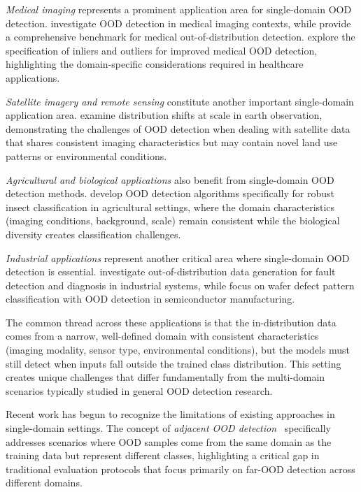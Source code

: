 \documentclass[11pt, oneside]{book}
\theoremstyle{plain}
\theoremstyle{definition}
\theoremstyle{remark}
\begin{document}
\emph{Medical imaging} represents a prominent application area for single-domain OOD detection. \citet{zhang2021out} investigate OOD detection in medical imaging contexts, while \citet{cao2020benchmark} provide a comprehensive benchmark for medical out-of-distribution detection. \citet{narayanaswamy2023exploring} explore the specification of inliers and outliers for improved medical OOD detection, highlighting the domain-specific considerations required in healthcare applications.

\emph{Satellite imagery and remote sensing} constitute another important single-domain application area. \citet{ekim2024distribution} examine distribution shifts at scale in earth observation, demonstrating the challenges of OOD detection when dealing with satellite data that shares consistent imaging characteristics but may contain novel land use patterns or environmental conditions.

\emph{Agricultural and biological applications} also benefit from single-domain OOD detection methods. \citet{saadati2024out} develop OOD detection algorithms specifically for robust insect classification in agricultural settings, where the domain characteristics (imaging conditions, background, scale) remain consistent while the biological diversity creates classification challenges.

\emph{Industrial applications} represent another critical area where single-domain OOD detection is essential. \citet{kafunah2023out} investigate out-of-distribution data generation for fault detection and diagnosis in industrial systems, while \citet{kim2021wafer} focus on wafer defect pattern classification with OOD detection in semiconductor manufacturing.

The common thread across these applications is that the in-distribution data comes from a narrow, well-defined domain with consistent characteristics (imaging modality, sensor type, environmental conditions), but the models must still detect when inputs fall outside the trained class distribution. This setting creates unique challenges that differ fundamentally from the multi-domain scenarios typically studied in general OOD detection research.

Recent work has begun to recognize the limitations of existing approaches in single-domain settings. The concept of \emph{adjacent OOD detection}~\citep{yangcan} specifically addresses scenarios where OOD samples come from the same domain as the training data but represent different classes, highlighting a critical gap in traditional evaluation protocols that focus primarily on far-OOD detection across different domains.
\end{document}
